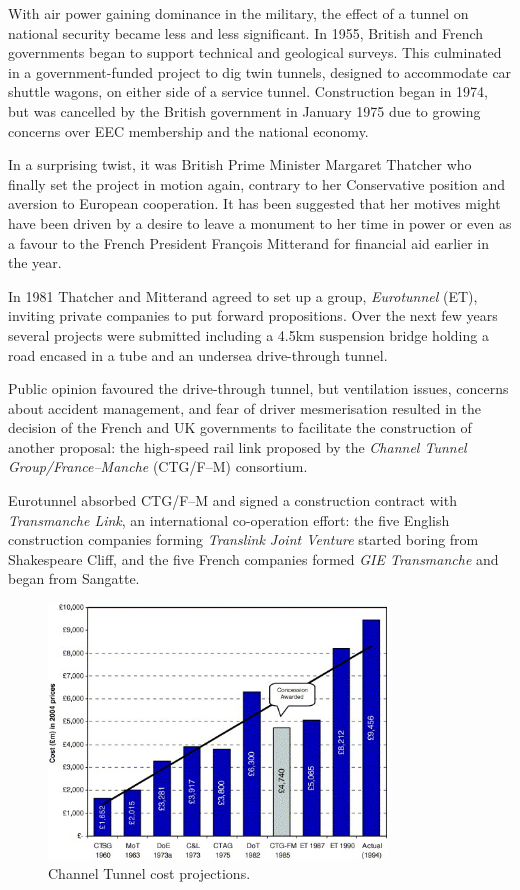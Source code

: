 \documentclass[12pt]{article} %
\begin{document}
With air power gaining dominance in the military, the effect of a tunnel on national security became less and less significant. In 1955, British and French governments began to support technical and geological surveys. This culminated in a government-funded project to dig twin tunnels, designed to accommodate car shuttle wagons, on either side of a service tunnel. Construction began in 1974, but was cancelled by the British government in January 1975 due to growing concerns over EEC membership and the national economy.

In a surprising twist, it was British Prime Minister Margaret Thatcher who finally set the project in motion again, contrary to her Conservative position and aversion to European cooperation. It has been suggested that her motives might have been driven by a desire to leave a monument to her time in power or even as a favour to the French President François Mitterand for financial aid earlier in the year.\cite{anderson}

In 1981 Thatcher and Mitterand agreed to set up a group, \emph{Eurotunnel} (ET), inviting private companies to put forward propositions. Over the next few years several projects were submitted including a 4.5km suspension bridge holding a road encased in a tube and an undersea drive-through tunnel.

Public opinion favoured the drive-through tunnel, but ventilation issues, concerns about accident management, and fear of driver mesmerisation resulted in the decision of the French and UK governments to facilitate the construction of another proposal: the high-speed rail link proposed by the \emph{Channel Tunnel Group\slash France--Manche} (CTG\slash F--M) consortium.

Eurotunnel absorbed CTG\slash F--M and signed a construction contract with \emph{Transmanche Link}, an international co-operation effort: the five English construction companies forming \emph{Translink Joint Venture} started boring from Shakespeare Cliff, and the five French companies formed \emph{GIE Transmanche} and began from Sangatte.

\begin{figure}[hp]
  \centering
  \includegraphics[width=0.8\textwidth]{costproj}
  \caption{Channel Tunnel cost projections.}
  \label{fig:costproj}
\end{figure}
\end{document}
